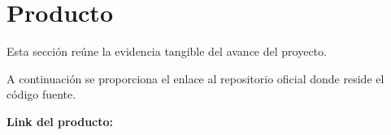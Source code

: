\section{Producto}
Esta sección reúne la evidencia tangible del avance del proyecto.  

A continuación se proporciona el enlace al repositorio oficial donde reside
el código fuente.

\textbf{Link del producto:} \linkProducto \\
